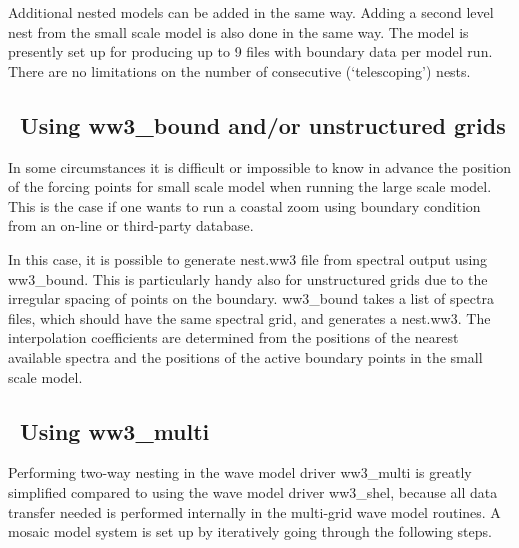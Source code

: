 \noindent
Additional nested models can be added in the same way. Adding a second level
nest from the small scale model is also done in the same way. The model is
presently set up for producing up to 9 files with boundary data per model
run. There are no limitations on the number of consecutive (`telescoping')
nests.

\vssub
\subsection{~Using {\file ww3\_bound} and/or unstructured grids}
\vssub

In some circumstances it is difficult or impossible to know in advance the
position of the forcing points for small scale model when running the large
scale model. This is the case if one wants to run a coastal zoom using
boundary condition from an on-line or third-party database.

In this case, it is possible to generate {\file nest.ww3} file from spectral
output using {\code ww3\_bound}. This is particularly handy also for
unstructured grids due to the irregular spacing of points on the
boundary. {\code ww3\_bound} takes a list of spectra files, which should have
the same spectral grid, and generates a {\file nest.ww3}. The interpolation
coefficients are determined from the positions of the nearest available
spectra and the positions of the active boundary points in the small scale
model.

\pb
\subsection{~Using {\file ww3\_multi}}
\vssub

Performing two-way nesting in the wave model driver {\file ww3\_multi} is
greatly simplified compared to using the wave model driver {\file ww3\_shel},
because all data transfer needed is performed internally in the multi-grid
wave model routines. A mosaic model system is set up by iteratively going
through the following steps.

